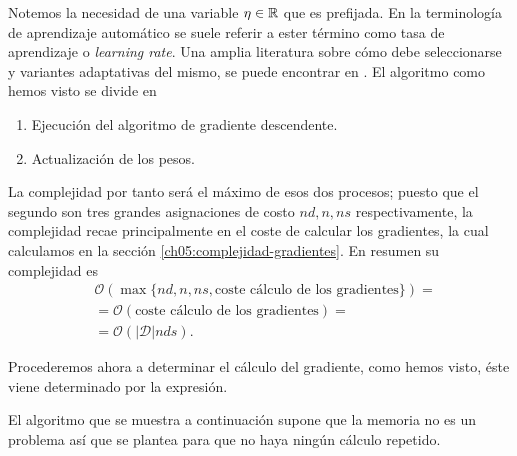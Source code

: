 Notemos la necesidad de una variable $\eta \in \mathbb{R}$ que es
 prefijada. En la terminología de aprendizaje automático 
se suele referir a ester término 
como tasa de aprendizaje o \textit{learning rate}.
Una amplia literatura sobre cómo debe seleccionarse 
y variantes adaptativas del mismo, 
se puede encontrar en \cite{MostafaLearningFromData}. 
El algoritmo como hemos visto se divide en 
\begin{enumerate}
    \item Ejecución del algoritmo de gradiente descendente.
    \item Actualización de los pesos. 
\end{enumerate}

La complejidad por tanto será el máximo de esos dos procesos;
puesto que el segundo son tres grandes asignaciones de costo $n d , n, n s$ respectivamente,  
la complejidad recae principalmente en el coste de calcular los gradientes, 
la cual calculamos en la sección \ref{ch05:complejidad-gradientes}. 
En resumen su complejidad es 
\begin{align*}
    &\mathcal{O}(
        \max\{
            n d ,  n, n s, 
            \text{coste cálculo de los gradientes}
        \}
    )
    = \\
    & = 
    \mathcal{O}(
        \text{coste cálculo de los gradientes}
    )
    =  \\
    & 
    = 
    \mathcal{O}(|\mathcal{D}| n d s).
\end{align*} 

Procederemos ahora a determinar el cálculo del gradiente, como hemos visto, éste viene determinado por la expresión. 

El algoritmo que se muestra a continuación supone que la memoria no es un problema así que se plantea para que no haya ningún cálculo repetido. 
\pagebreak  


